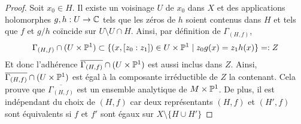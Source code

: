 \documentclass[a4page,10pt]{article}
\begin{document}
\begin{proof}
Soit $x_0 \in H$. Il existe un voisinage $U$ de $x_0$ dans $X$ et des applications holomorphes $g,h : U \to \C$ tels que les z\'eros de $h$ soient contenus dans $H$ et tels que $f$ et $g/h$ co\"incide sur $U\setminus U \cap H$. Ainsi, par d\'efinition de $\Gamma_{(H,f)}$, 
	\[\Gamma_{(H,f)} \cap (U \times \P^1) \subset \{ (x,[z_0 : z_1]) \in U \times \P^1 \mid z_0g(x)=z_1 h(x) \}=:Z
\]
Et donc l'adh\'erence $\overline{\Gamma_{(H,f)}}\cap (U \times \P^1)$ est aussi inclus dans $Z$. Ainsi, $\overline{\Gamma_{(H,f)}}\cap (U \times \P^1)$ est \'egal \`a la composante irr\'eductible de $Z$ la contenant. Cela prouve que $\overline{\Gamma_{(H,f)}}$ est un ensemble analytique de $M \times \P^1$. De plus, il est ind\'ependant du choix de $(H,f)$ car deux repr\'esentants $(H,f)$ et $(H',f)$ sont \'equivalents si $f$ et $f'$ sont \'egaux sur $X \setminus \{H \cup H'\}$
\end{proof}
%
%
\end{document}
